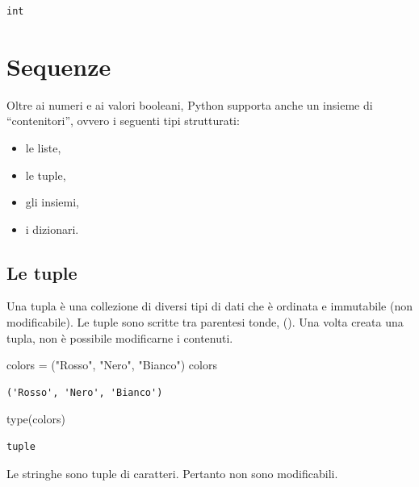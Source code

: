 \documentclass[
  letterpaper,
  krantz2]{{[}./krantz{]}}
\newenvironment{Shaded}{\begin{snugshade}}{\end{snugshade}}
\newcommand{\BuiltInTok}[1]{\textcolor[rgb]{0.00,0.23,0.31}{#1}}
\newcommand{\NormalTok}[1]{\textcolor[rgb]{0.00,0.23,0.31}{#1}}
\newcommand{\OperatorTok}[1]{\textcolor[rgb]{0.37,0.37,0.37}{#1}}
\newcommand{\StringTok}[1]{\textcolor[rgb]{0.13,0.47,0.30}{#1}}
\providecommand{\tightlist}{%
  \setlength{\itemsep}{0pt}\setlength{\parskip}{0pt}}\usepackage{longtable,booktabs,array}
\begin{document}
\begin{verbatim}
int
\end{verbatim}

\section{Sequenze}\label{sequenze}

Oltre ai numeri e ai valori booleani, Python supporta anche un insieme
di ``contenitori'', ovvero i seguenti tipi strutturati:

\begin{itemize}
\tightlist
\item
  le liste,
\item
  le tuple,
\item
  gli insiemi,
\item
  i dizionari.
\end{itemize}

\subsection{Le tuple}\label{le-tuple}

Una tupla è una collezione di diversi tipi di dati che è ordinata e
immutabile (non modificabile). Le tuple sono scritte tra parentesi
tonde, (). Una volta creata una tupla, non è possibile modificarne i
contenuti.

\begin{Shaded}
\begin{Highlighting}[]
\NormalTok{colors }\OperatorTok{=}\NormalTok{ (}\StringTok{"Rosso"}\NormalTok{, }\StringTok{"Nero"}\NormalTok{, }\StringTok{"Bianco"}\NormalTok{)}
\NormalTok{colors}
\end{Highlighting}
\end{Shaded}

\begin{verbatim}
('Rosso', 'Nero', 'Bianco')
\end{verbatim}

\begin{Shaded}
\begin{Highlighting}[]
\BuiltInTok{type}\NormalTok{(colors)}
\end{Highlighting}
\end{Shaded}

\begin{verbatim}
tuple
\end{verbatim}

Le stringhe sono tuple di caratteri. Pertanto non sono modificabili.
\end{document}
